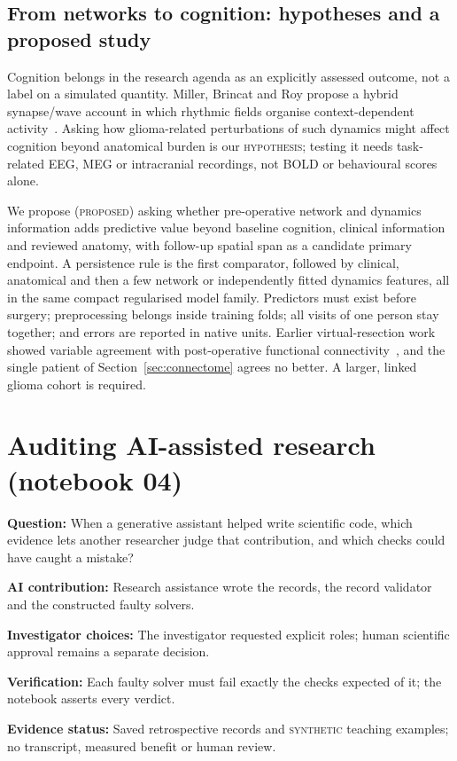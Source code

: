 \documentclass[11pt,a4paper]{article}
\newcommand{\aicontribution}[5]{\par\nobreak\smallskip\noindent
\begin{minipage}{\linewidth}\small
\noindent\textbf{Question:} #1\par
\noindent\textbf{AI contribution:} #2\par
\noindent\textbf{Investigator choices:} #3\par
\noindent\textbf{Verification:} #4\par
\noindent\textbf{Evidence status:} #5\par\end{minipage}\par\smallskip}
\newcommand{\evidence}[1]{\textsc{#1}}
\begin{document}
\subsection{From networks to cognition: hypotheses and a proposed study}

Cognition belongs in the research agenda as an explicitly assessed outcome,
not a label on a simulated quantity. Miller, Brincat and Roy propose a hybrid
synapse/wave account in which rhythmic fields organise context-dependent
activity~\cite{miller2026}. Asking how glioma-related perturbations of such
dynamics might affect cognition beyond anatomical burden is our
\evidence{hypothesis}; testing it needs task-related EEG, MEG or intracranial
recordings, not BOLD or behavioural scores alone.

We propose (\evidence{proposed}) asking whether pre-operative network and
dynamics information adds predictive value beyond baseline cognition,
clinical information and reviewed anatomy, with follow-up spatial span as a
candidate primary endpoint. A persistence rule is the first comparator,
followed by clinical, anatomical and then a few network or independently
fitted dynamics features, all in the same compact regularised model family.
Predictors must exist before surgery; preprocessing belongs inside training
folds; all visits of one person stay together; and errors are reported in
native units. Earlier virtual-resection work showed variable agreement with
post-operative functional connectivity~\cite{aerts2020}, and the single
patient of Section~\ref{sec:connectome} agrees no better. A larger, linked
glioma cohort is required.

\section{Auditing AI-assisted research (notebook 04)}
\label{sec:audit}

\aicontribution
{When a generative assistant helped write scientific code, which evidence lets another researcher judge that contribution, and which checks could have caught a mistake?}
{Research assistance wrote the records, the record validator and the constructed faulty solvers.}
{The investigator requested explicit roles; human scientific approval remains a separate decision.}
{Each faulty solver must fail exactly the checks expected of it; the notebook asserts every verdict.}
{Saved retrospective records and \evidence{synthetic} teaching examples; no transcript, measured benefit or human review.}
\end{document}
